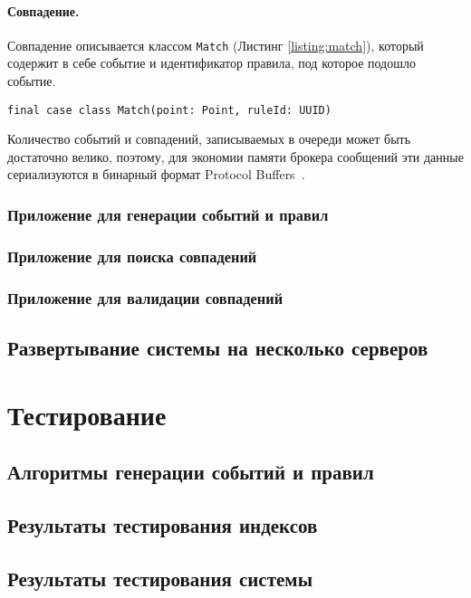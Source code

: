 \documentclass[14pt]{article}
\begin{document}
\paragraph{Совпадение.} Совпадение описывается классом \verb|Match| (Листинг \ref{listing:match}), который содержит в себе событие и идентификатор правила, под которое подошло событие.
\begin{lstlisting}[style=scalaStyle,caption={Класс, описывающий совпадение},label={listing:match},captionpos=b, float]
final case class Match(point: Point, ruleId: UUID)
\end{lstlisting}


Количество событий и совпадений, записываемых в очереди может быть достаточно велико, поэтому, для экономии памяти брокера сообщений эти данные сериализуются в бинарный формат Protocol Buffers~\cite{protobuf}.

\subsubsection{Приложение для генерации событий и правил}
\subsubsection{Приложение для поиска совпадений}
\label{section:classifier}
\subsubsection{Приложение для валидации совпадений}
\subsection{Развертывание системы на несколько серверов}

\section{Тестирование}
\label{section:testing}
\subsection{Алгоритмы генерации событий и правил}
\subsection{Результаты тестирования индексов}
\subsection{Результаты тестирования системы}
\end{document}

